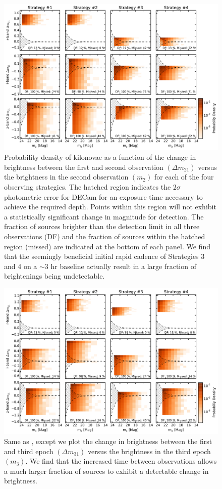 \begin{figure}[t!]
\centering
\includegraphics[width=\textwidth]{./figs/chapter2/ch2_f6.pdf}
\caption{Probability density of kilonovae as a function of the change in brightness between the first and second observation $(\Delta m_21)$ versus the brightness in the second observation $(m_2)$ for each of the four observing strategies. The hatched region indicates the $2\sigma$ photometric error for DECam for an exposure time necessary to achieve the required depth. Points within this region will not exhibit a statistically significant change in magnitude for detection. The fraction of sources brighter than the detection limit in all three observations (DF) and the fraction of sources within the hatched region (missed) are indicated at the bottom of each panel. We find that the seemingly beneficial initial rapid cadence of Strategies 3 and 4 on a $\sim$3 hr baseline actually result in a large fraction of brightenings being undetectable.}
\label{fig:ch2_delm2}
\end{figure}

\begin{figure}[t!]
\centering
\includegraphics[width=\textwidth]{./figs/chapter2/ch2_f7.pdf}
\caption{Same as , except we plot the change in brightness between the first and third epoch $(\Delta m_{31})$ versus the brightness in the third epoch $(m_3)$. We find that the increased time between observations allows a much larger fraction of sources to exhibit a detectable change in brightness.}
\label{fig:ch2_delm3}
\end{figure}

